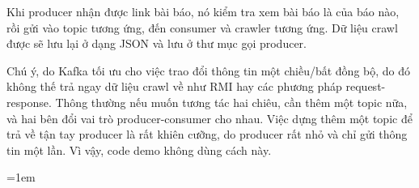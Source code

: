 \documentclass{article}
\begin{document}
Khi producer nhận được link bài báo, nó kiểm tra xem bài báo là của báo nào, rồi
gửi vào topic tương ứng, đến consumer và crawler tương ứng. Dữ liệu crawl được
sẽ lưu lại ở dạng JSON và lưu ở thư mục gọi producer.

Chú ý, do Kafka tối ưu cho việc trao đổi thông tin một chiều/bất đồng bộ, do đó
không thế trả ngay dữ liệu crawl về như RMI hay các phương pháp
request-response. Thông thường nếu muốn tương tác hai chiêu, cần thêm một topic
nữa, và hai bên đổi vai trò producer-consumer cho nhau. Việc dựng thêm một topic
để trả về tận tay producer là rất khiên cưỡng, do producer rất nhỏ và chỉ gửi
thông tin một lần. Vì vậy, code demo không dùng cách này.

\emergencystretch=1em
\printbibliography[title={Tài liệu tham khảo}]
\end{document}

